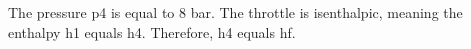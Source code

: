 The pressure p4 is equal to 8 bar. The throttle is isenthalpic, meaning the enthalpy h1 equals h4. Therefore, h4 equals hf.